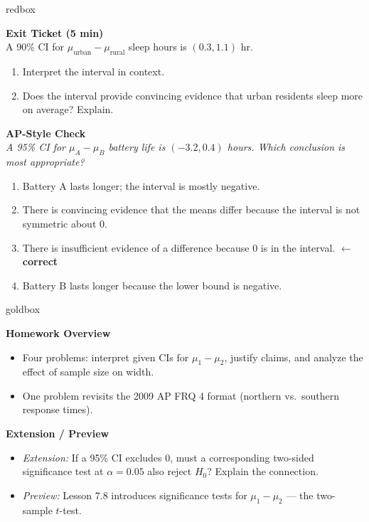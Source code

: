 \documentclass[10pt]{article}
\begin{document}
\begin{skillbox}{redbox}
\begin{minipage}[t]{0.48\linewidth}
    \textbf{Exit Ticket (5 min)}\\
    A 90\% CI for $\mu_{\text{urban}} - \mu_{\text{rural}}$ sleep hours is $(0.3, 1.1)$ hr.
    \begin{enumerate}
        \item Interpret the interval in context.
        \item Does the interval provide convincing evidence that urban residents sleep
              more on average? Explain.
    \end{enumerate}
\end{minipage}
\hfill
\begin{minipage}[t]{0.48\linewidth}
    \textbf{AP-Style Check}\\
    \textit{A 95\% CI for $\mu_A - \mu_B$ battery life is $(-3.2, 0.4)$ hours.
    Which conclusion is most appropriate?}
    \begin{enumerate}[label=(\Alph*)]
        \item Battery A lasts longer; the interval is mostly negative.
        \item There is convincing evidence that the means differ because the interval
              is not symmetric about 0.
        \item There is insufficient evidence of a difference because 0 is in the interval.
              \textcolor{keyred}{\textbf{$\leftarrow$ correct}}
        \item Battery B lasts longer because the lower bound is negative.
    \end{enumerate}
\end{minipage}
\end{skillbox}

\begin{skillbox}{goldbox}
\begin{minipage}[t]{0.48\linewidth}
    \textbf{Homework Overview}
    \begin{itemize}
        \item Four problems: interpret given CIs for $\mu_1 - \mu_2$, justify claims, and
              analyze the effect of sample size on width.
        \item One problem revisits the 2009 AP FRQ 4 format (northern vs.\ southern
              response times).
    \end{itemize}
\end{minipage}
\hfill
\begin{minipage}[t]{0.48\linewidth}
    \textbf{Extension / Preview}
    \begin{itemize}
        \item \textit{Extension:} If a 95\% CI excludes 0, must a corresponding
              two-sided significance test at $\alpha = 0.05$ also reject $H_0$?
              Explain the connection.
        \item \textit{Preview:} Lesson 7.8 introduces significance tests for
              $\mu_1 - \mu_2$ --- the two-sample $t$-test.
    \end{itemize}
\end{minipage}
\end{skillbox}
\end{document}
